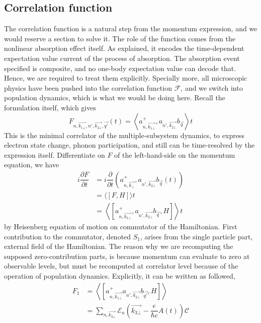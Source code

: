 \documentclass[%
 reprint,
 amsmath,amssymb,
 aps,
]{revtex4-2}
\begin{document}
\subsection{Correlation function}
The correlation function is a natural step from the momentum expression, and we would reserve a section to solve it. The role of the function comes from the nonlinear absorption effect itself. As explained, it encodes the time-dependent expectation value current of the process of absorption. The absorption event specified is composite, and no one-body expectation value can decode that. Hence, we are required to treat them explicitly. Specially more, all microscopic physics have been pushed into the correlation function $\mathcal{F}$, and we switch into population dynamics, which is what we would be doing here. Recall the formulation itself, which gives
\begin{equation}
    F_{n, \vec{k_{1\bot}}, n',\vec{k_{2\bot}},\vec{q'}}(t)= \left\langle a^+_{n,\vec{k_{1\bot}}},a_{n', \vec{k_{2\bot}}}b_{\vec{q}} \right\rangle t
\end{equation}
This is the minimal correlator of the multiple-subsystem dynamics, to express electron state change, phonon participation, and still can be time-resolved by the expression itself. Differentiate on $F$ of the left-hand-side on the momentum equation, we have
\begin{align*}
    i \dfrac{\partial F}{\partial t} &= i \dfrac{\partial}{\partial t}\left(a^+_{n, \vec{k_\bot}}, a_{n', \vec{k_{2\bot}}}b_{\vec{q}}(t)\right)\\
    &= \langle [F,H] \rangle t\\
    &= \left\langle\left[a^+_{n,\vec{k_{1\bot}}},a_{n', \vec{k_{2\bot}}}b_{\vec{q}},H\right] \right\rangle t
\end{align*}
by Heisenberg equation of motion on commutator of the Hamiltonian. First contribution to the commutator, denoted $S_1$, arises from the single particle part, external field of the Hamiltonian. The reason why we are recomputing the supposed zero-contribution parts, is because momentum can evaluate to zero at observable levels, but must be recomputed at correlator level because of the operation of population dynamics. Explicitly, it can be written as followed,
\begin{align*}
    F_1 &= \left \langle \left[a^+_{n,\vec{k_{1\bot}}}a_{n',\vec{k_{2\bot}}}b_{\vec{q'}}, H\right] \right \rangle \\
    &= \sum_{n,\vec{k_{3\bot}}}\mathcal{E}_{n}\left(\vec{k_{3\bot}}-\dfrac{e}{\hbar c}A(t)\right) \mathcal{C}  \\
\end{align*}
\end{document}
